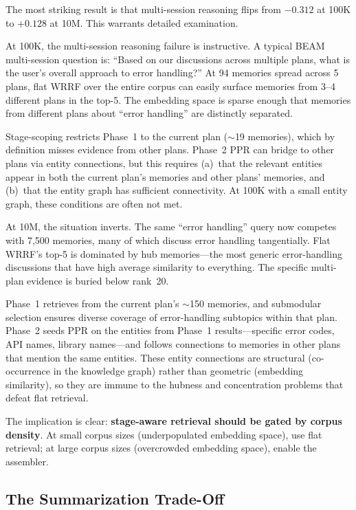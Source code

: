 \documentclass[11pt]{article}
\begin{document}
The most striking result is that multi-session reasoning flips from
$-0.312$ at 100K to $+0.128$ at 10M.  This warrants detailed
examination.

At 100K, the multi-session reasoning failure is instructive.  A
typical BEAM multi-session question is: ``Based on our discussions
across multiple plans, what is the user's overall approach to error
handling?''  At 94 memories spread across 5 plans, flat WRRF over the
entire corpus can easily surface memories from 3--4 different plans in
the top-5.  The embedding space is sparse enough that memories from
different plans about ``error handling'' are distinctly separated.

Stage-scoping restricts Phase~1 to the current plan ($\sim$19
memories), which by definition misses evidence from other plans.
Phase~2 PPR can bridge to other plans via entity connections, but
this requires (a)~that the relevant entities appear in both the
current plan's memories and other plans' memories, and (b)~that the
entity graph has sufficient connectivity.  At 100K with a small entity
graph, these conditions are often not met.

At 10M, the situation inverts.  The same ``error handling'' query now
competes with 7,500 memories, many of which discuss error handling
tangentially.  Flat WRRF's top-5 is dominated by hub memories---the
most generic error-handling discussions that have high average
similarity to everything.  The specific multi-plan evidence is buried
below rank~20.

Phase~1 retrieves from the current plan's $\sim$150 memories, and
submodular selection ensures diverse coverage of error-handling
subtopics within that plan.  Phase~2 seeds PPR on the entities from
Phase~1 results---specific error codes, API names, library
names---and follows connections to memories in other plans that mention
the same entities.  These entity connections are structural
(co-occurrence in the knowledge graph) rather than geometric
(embedding similarity), so they are immune to the hubness and
concentration problems that defeat flat retrieval.

The implication is clear: \textbf{stage-aware retrieval should be
gated by corpus density}.  At small corpus sizes (underpopulated
embedding space), use flat retrieval; at large corpus sizes
(overcrowded embedding space), enable the assembler.

\subsection{The Summarization Trade-Off}
\label{sec:summarization-tradeoff}
\end{document}
